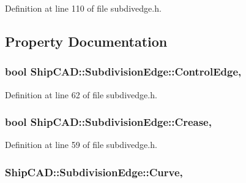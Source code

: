 Definition at line 110 of file subdivedge.\-h.



\subsection{Property Documentation}
\hypertarget{classShipCAD_1_1SubdivisionEdge_a9543fdb35c1b51844207ebcfeb743197}{
\subsubsection[{Control\-Edge}]{\setlength{\rightskip}{0pt plus 5cm}bool Ship\-C\-A\-D\-::\-Subdivision\-Edge\-::\-Control\-Edge\hspace{0.3cm}{\ttfamily [read]}, {\ttfamily [write]}}}\label{classShipCAD_1_1SubdivisionEdge_a9543fdb35c1b51844207ebcfeb743197}


Definition at line 62 of file subdivedge.\-h.

\hypertarget{classShipCAD_1_1SubdivisionEdge_ae4e748e28975f806703ffbd458bb66a2}{
\subsubsection[{Crease}]{\setlength{\rightskip}{0pt plus 5cm}bool Ship\-C\-A\-D\-::\-Subdivision\-Edge\-::\-Crease\hspace{0.3cm}{\ttfamily [read]}, {\ttfamily [write]}}}\label{classShipCAD_1_1SubdivisionEdge_ae4e748e28975f806703ffbd458bb66a2}


Definition at line 59 of file subdivedge.\-h.

\hypertarget{classShipCAD_1_1SubdivisionEdge_af7e2dfad80e8f8dce7a7159c3b18949c}{
\subsubsection[{Curve}]{ Ship\-C\-A\-D\-::\-Subdivision\-Edge\-::\-Curve\hspace{0.3cm}{\ttfamily [read]}, {\ttfamily [write]}}}\label{classShipCAD_1_1SubdivisionEdge_af7e2dfad80e8f8dce7a7159c3b18949c}


